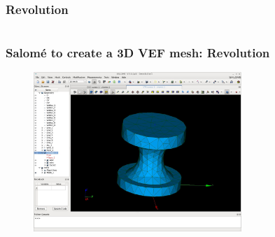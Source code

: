 \documentclass[10pt]{beamer}
\begin{document}
\subsubsection{Revolution}
\begin{frame}
\begin{columns}[c] 
\tableofcontents[sections={1-7},currentsection, currentsubsection]
\tableofcontents[sections={8-13},currentsection, currentsubsection]
\end{columns}
\end{frame}
\begin{frame}
\frametitle{Salom\'e to create a 3D VEF mesh: Revolution}

\begin{figure}
\includegraphics[width=0.7\textwidth]{PICTURES/salome9.jpg}
\end{figure}

\end{frame}
\end{document}
